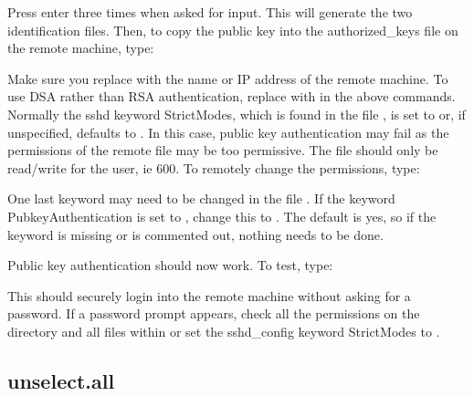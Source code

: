 

Press enter three times when asked for input.  This will generate the two identification
files.  Then, to copy the public key into the authorized\_keys file on the remote machine,
type:



Make sure you replace 
 with the name or IP address of the remote machine.  To use
DSA rather than RSA authentication, replace 
 with 
 in the above commands.
Normally the sshd keyword StrictModes, which is found in the file 
, is
set to 
 or, if unspecified, defaults to 
.  In this case, public key authentication
may fail as the permissions of the remote file 
 may be too
permissive.  The file should only be read/write for the user, ie 600.  To remotely change
the permissions, type:



One last keyword may need to be changed in the file 
.  If the keyword
PubkeyAuthentication is set to 
, change this to 
.  The default is yes, so if the
keyword is missing or is commented out, nothing needs to be done.

Public key authentication should now work.  To test, type:



This should securely login into the remote machine without asking for a password.  If a
password prompt appears, check all the permissions on the directory 
 and all files
within or set the sshd\_config keyword StrictModes to 
.






\newpage

\subsection{unselect.all}


